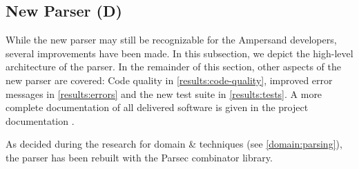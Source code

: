 
\subsection{New Parser (D)}
\label{results:parser}
While the new parser may still be recognizable for the Ampersand developers, several improvements have been made.
In this subsection, we depict the high-level architecture of the parser.
In the remainder of this section, other aspects of the new parser are covered: Code quality in \autoref{results:code-quality}, improved error messages in \autoref{results:errors} and the new test suite in \autoref{results:tests}.
A more complete documentation of all delivered software is given in the project documentation .

As decided during the research for domain \& techniques (see \autoref{domain:parsing}), the parser has been rebuilt with the Parsec combinator library.
